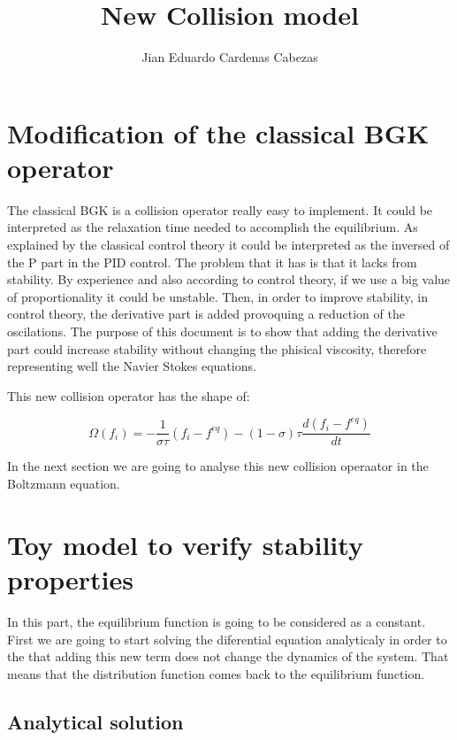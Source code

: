 \documentclass{article}
\title{\textbf{New Collision model}}
\author{Jian Eduardo Cardenas Cabezas}
\begin{document}
\maketitle

\section{Modification of the classical BGK operator}
The classical BGK is a collision operator really easy to implement. It could be interpreted as the relaxation time needed to accomplish the equilibrium.
As explained by the classical control theory it could be interpreted as the inversed of the P part in the PID control. The problem that it has is that it lacks from stability.
By experience and also according to control theory, if we use a big value of proportionality it could be unstable. Then, in order to improve stability, in control theory,
the derivative part is added provoquing a reduction of the oscilations. 
The purpose of this document is to show that adding the derivative part could increase stability without changing the phisical viscosity, therefore representing well the
Navier Stokes equations.

This new collision operator has the shape of:

\begin{equation}
    \Omega(f_i) = -\frac{1}{\sigma\tau}(f_i-f^{eq}) - (1-\sigma)\tau\frac{d(f_i-f^{eq})}{dt}    
\end{equation}

In the next section we are going to analyse this new collision operaator in the Boltzmann equation.


\section{Toy model to verify stability properties}

In this part, the equilibrium function is going to be considered as a constant.
First we are going to start solving the diferential equation analyticaly in order to the that adding this new term does not change the dynamics of the system.
That means that the distribution function comes back to the equilibrium function.

\subsection{Analytical solution}
\end{document}
